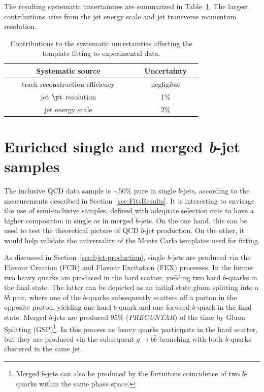 The resulting systematic uncertainties are summarized in Table~\ref{tb:systematicsfits}. The largest contributions arise from the jet energy scale and jet transverse momentum resolution.
\begin{table}[!hbt] %
\renewcommand{\arraystretch}{1.2}
\centering
\begin{tabular}{ | c | c |}
\hline
  ~~~~~~~Systematic source~~~~~~~ &~~Uncertainty~~\\ \hline
  track reconstruction efficiency  &    negligible        \\ 
  jet $\pt$ resolution  &    1\%        \\  
  jet energy scale  &    2\%        \\ 
\hline 
\end{tabular}
\caption{Contributions to the systematic uncertainties affecting the template fitting to experimental data.}
\label{tb:systematicsfits}
\end{table}


\section{Enriched single and merged {\em b}-jet samples}\label{sec:Enriched}

The inclusive QCD data sample is $\sim$50\% pure in single $b$-jets, according to the measurements described in Section~\ref{sec:FitsResults}. It is interesting to envisage the use of semi-inclusive samples, defined with adequate selection cuts to have a higher composition in single or in merged $b$-jets. On the one hand, this can be used to test the theoretical picture of QCD $b$-jet production. On the other, it would help validate the universality of the Monte Carlo templates used for fitting. 

As discussed in Section~\ref{sec:bjet-production}, single $b$-jets are produced via the Flavour Creation (FCR) and Flavour Excitation (FEX) processes.  In the former two heavy quarks are produced in the hard scatter, yielding two hard $b$-quarks in the final state. The latter can be depicted as an initial state gluon splitting into a $b\bar{b}$ pair, where one of the $b$-quarks subsequently scatters off a parton in the opposite proton, yielding one hard $b$-quark and one forward $b$-quark in the final state.
Merged $b$-jets are produced 95\% ({\em PREGUNTAR}) of the time by Gluon Splitting (GSP)\footnote{Merged $b$-jets can also be produced by the fortuitous coincidence of two $b$-quarks within the same phase space.}. In this process no heavy quarks participate in the hard scatter, but they are produced via the subsequent $g \rightarrow b\bar{b}$ branching with both $b$-quarks clustered in the same jet. 

